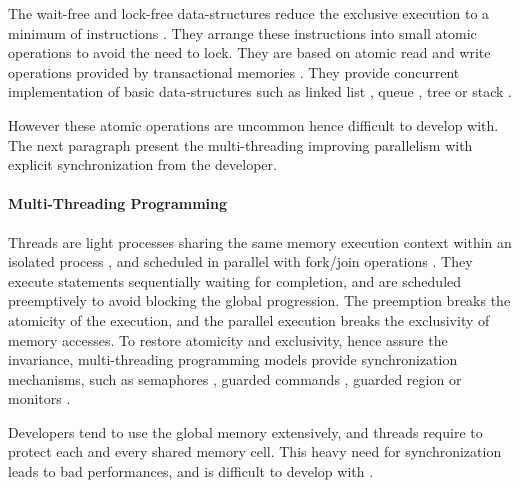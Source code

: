 The wait-free and lock-free data-structures reduce the exclusive execution to a minimum of instructions \cite{Lamport1977,Herlihy1988,Herlihy1990,Herlihy1991,Anderson1990}.
They arrange these instructions into small atomic operations to avoid the need to lock.
They are based on atomic read and write operations provided by transactional memories \cite{Harris2010}.
They provide concurrent implementation of basic data-structures such as linked list \cite{Valois1995,Timnat2012}, queue \cite{Sundell2003,Wimmer2015}, tree \cite{Ramachandran2015} or stack \cite{Hendler2004}.

However these atomic operations are uncommon hence difficult to develop with.
The next paragraph present the multi-threading improving parallelism with explicit synchronization from the developer.



\paragraph{Multi-Threading Programming}

Threads are light processes sharing the same memory execution context within an isolated process \cite{Dijkstra1968}, and scheduled in parallel with fork/join operations \cite{Randall1998,Frigo1998,Leiserson2010}.
They execute statements sequentially waiting for completion, and are scheduled preemptively to avoid blocking the global progression.
The preemption breaks the atomicity of the execution, and the parallel execution breaks the exclusivity of memory accesses.
To restore atomicity and exclusivity, hence assure the invariance, multi-threading programming models provide synchronization mechanisms, such as semaphores \cite{Dijkstra}, guarded commands \cite{Dijkstra1975}, guarded region \cite{Hansen1978a} or monitors \cite{Hoare1974}.

Developers tend to use the global memory extensively, and threads require to protect each and every shared memory cell.
This heavy need for synchronization leads to bad performances, and is difficult to develop with \cite{Adya2002}.

